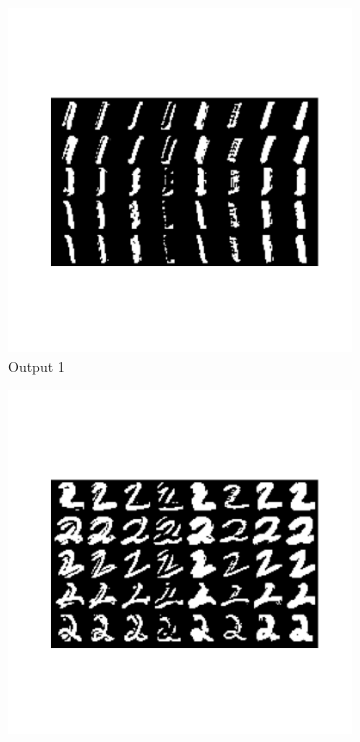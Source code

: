 \documentclass{assignment}
\begin{document}
\begin{figure}[htbp!]
\begin{subfigure}{0.3\textwidth}
        \includegraphics[width=\textwidth]{figures/out_1.png}
        \caption{Output 1}
    \end{subfigure}\hfill
    \begin{subfigure}{0.3\textwidth}
        \includegraphics[width=\textwidth]{figures/out_2.png}

\end{subfigure}
\end{figure}
\end{document}
